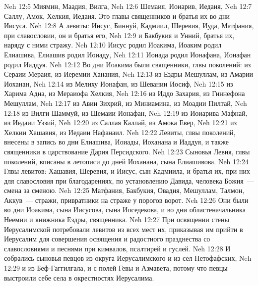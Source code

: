 \vs Neh 12:5 Миямин, Маадия, Вилга,
\vs Neh 12:6 Шемаия, Иоиарив, Иедаия,
\vs Neh 12:7 Саллу, Амок, Хелкия, Иедаия. Это главы священников и братья их во дни Иисуса.
\vs Neh 12:8 А левиты: Иисус, Биннуй, Кадмиил, Шеревия, Иуда, Матфания,  при славословии, он и братья его,
\vs Neh 12:9 и Бакбукия и Унний, братья их, наряду с ними  стражу.
\vs Neh 12:10 Иисус родил Иоакима, Иоаким родил Елиашива, Елиашив родил Иоиаду,
\vs Neh 12:11 Иоиада родил Ионафана, Ионафан родил Иаддуя.
\rsbpar\vs Neh 12:12 Во дни Иоакима были священники, глвы поколений: из  Сераии Мераия, из  Иеремии Ханания,
\vs Neh 12:13 из  Ездры Мешуллам, из  Амарии Иоханан,
\vs Neh 12:14 из  Мелиху Ионафан, из  Шевании Иосиф,
\vs Neh 12:15 из  Харима Адна, из  Мераиофа Хелкия,
\vs Neh 12:16 из  Иддо Захария, из  Гиннефона Мешуллам,
\vs Neh 12:17 из  Авии Зихрий, из  Миниамина, из  Моадии Пилтай,
\vs Neh 12:18 из  Вилги Шаммуй, из  Шемаии Ионафан,
\vs Neh 12:19 из  Иоиарива Мафнай, из  Иедаии Уззий,
\vs Neh 12:20 из  Саллая Каллай, из  Амока Евер,
\vs Neh 12:21 из  Хелкии Хашавия, из  Иедаии Нафанаил.
\rsbpar\vs Neh 12:22 Левиты, глвы поколений, внесены в запись во дни Елиашива, Иоиады, Иоханана и Иаддуя, и также священники в царствование Дария Персидского.
\vs Neh 12:23 Сыновья Левия, глвы поколений, вписаны в летописи до дней Иоханана, сына Елиашивова.
\vs Neh 12:24 Глвы левитов: Хашавия, Шеревия, и Иисус, сын Кадмиила, и братья их, при них  для славословия при благодарениях, по установлению Давида, человека Божия~--- смена за сменою.
\vs Neh 12:25 Матфания, Бакбукия, Овадия, Мешуллам, Талмон, Аккув~--- стражи, привратники на страже у порогов ворот.
\vs Neh 12:26 Они были во дни Иоакима, сына Иисусова, сына Иоседекова, и во дни областеначальника Неемии и книжника Ездры, священника.
\rsbpar\vs Neh 12:27 При освящении стены Иерусалимской потребовали левитов из всех мест их, приказывая им прийти в Иерусалим для совершения освящения и радостного празднества со славословиями и песнями при  кимвалов, псалтирей и гуслей.
\vs Neh 12:28 И собрались сыновья певцов из округа Иерусалимского и из сел Нетофафских,
\vs Neh 12:29 и из Беф-Гаггилгала, и с полей Гевы и Азмавета, потому что певцы выстроили себе села в окрестностях Иерусалима.

